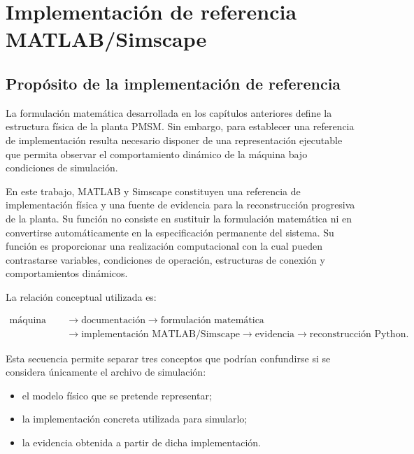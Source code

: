 \section{Implementación de referencia MATLAB/Simscape}

\subsection{Propósito de la implementación de referencia}

La formulación matemática desarrollada en los capítulos anteriores define la estructura física de la planta PMSM. Sin embargo, para establecer una referencia de implementación resulta necesario disponer de una representación ejecutable que permita observar el comportamiento dinámico de la máquina bajo condiciones de simulación.

En este trabajo, MATLAB y Simscape constituyen una referencia de implementación física y una fuente de evidencia para la reconstrucción progresiva de la planta. Su función no consiste en sustituir la formulación matemática ni en convertirse automáticamente en la especificación permanente del sistema. Su función es proporcionar una realización computacional con la cual pueden contrastarse variables, condiciones de operación, estructuras de conexión y comportamientos dinámicos.

La relación conceptual utilizada es:

\begin{equation}
\begin{aligned}
\text{máquina física}
&\rightarrow \text{documentación}
\rightarrow \text{formulación matemática}
\\
&\rightarrow \text{implementación MATLAB/Simscape}
\rightarrow \text{evidencia}
\rightarrow \text{reconstrucción Python}.
\end{aligned}
\end{equation}

Esta secuencia permite separar tres conceptos que podrían confundirse si se considera únicamente el archivo de simulación:

\begin{itemize}
    \item el modelo físico que se pretende representar;
    \item la implementación concreta utilizada para simularlo;
    \item la evidencia obtenida a partir de dicha implementación.
\end{itemize}

